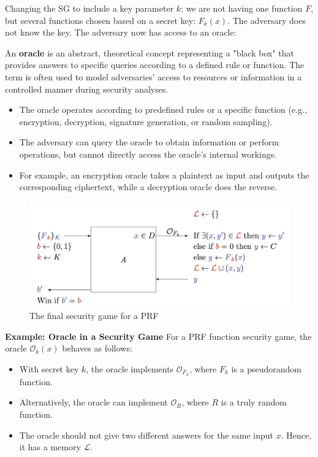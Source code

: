 Changing the SG to include a key parameter $k$: we are not having one function $F$, but several functions chosen based on a secret key: $F_k(x)$. The adversary does not know the key. The adversary now has access to an oracle: 

\begin{defn}
An \textbf{oracle} is an abstract, theoretical concept representing a "black box" that provides answers to specific queries according to a defined rule or function. The term is often used to model adversaries' access to resources or information in a controlled manner during security analyses.
\begin{itemize}
    \item The oracle operates according to predefined rules or a specific function (e.g., encryption, decryption, signature generation, or random sampling).
    \item The adversary can query the oracle to obtain information or perform operations, but cannot directly access the oracle's internal workings.
    \item For example, an encryption oracle takes a plaintext as input and outputs the corresponding ciphertext, while a decryption oracle does the reverse.
\end{itemize}
\end{defn}

\begin{figure}[h!]
    \centering
    \includegraphics[scale=0.5]{img/PRFfinal.png}
    \caption{The final security game for a PRF}
    \label{PRFfinal}
\end{figure}

\newpage
\textbf{Example: Oracle in a Security Game}
For a PRF function security game, the oracle $\mathcal{O}_k(x)$ behaves as follows:
\begin{itemize}
    \item With secret key $k$, the oracle implements $\mathcal{O}_{F_k}$, where $F_k$ is a pseudorandom function.
    \item Alternatively, the oracle can implement $\mathcal{O}_R$, where $R$ is a truly random function.
    \item The oracle should not give two different answers for the same input $x$. Hence, it has a memory $\mathcal{L}$.
\end{itemize}

